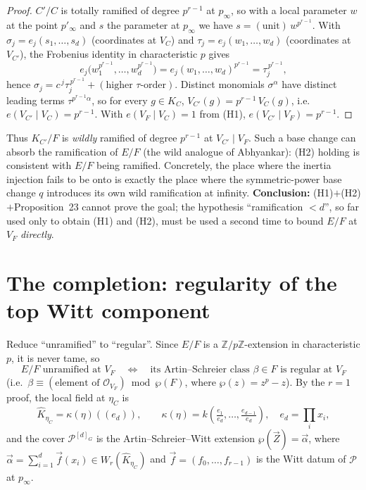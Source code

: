 \documentclass[11pt]{article}
\newcommand{\cP}{\mathcal{P}}
\newcommand{\Z}{\mathbb{Z}}
\newcommand{\Oo}{\mathcal{O}}
\newcommand{\AS}{\wp}
\theoremstyle{plain}
\theoremstyle{definition}
\providecommand{\AS}{\ensuremath{\wp}}
\begin{document}
\begin{proof}
$C'/C$ is totally ramified of degree $p^{r-1}$ at $p_\infty$, so with a local parameter
$w$ at the point $p'_\infty$ and $s$ the parameter at $p_\infty$ we have
$s=(\text{unit})\,w^{p^{r-1}}$. With $\sigma_j=e_j(s_1,\dots,s_d)$ (coordinates at $V_C$) and
$\tau_j=e_j(w_1,\dots,w_d)$ (coordinates at $V_{C'}$), the Frobenius identity in
characteristic $p$ gives
\[
e_j\big(w_1^{p^{r-1}},\dots,w_d^{p^{r-1}}\big)=e_j(w_1,\dots,w_d)^{p^{r-1}}=\tau_j^{\,p^{r-1}},
\]
hence $\sigma_j=c^{\,j}\tau_j^{\,p^{r-1}}+(\text{higher }\tau\text{-order})$. Distinct
monomials $\sigma^\alpha$ have distinct leading terms $\tau^{p^{r-1}\alpha}$, so for every
$g\in K_C$, $V_{C'}(g)=p^{r-1}\,V_C(g)$, i.e.\ $e(V_{C'}\mid V_C)=p^{r-1}$. With
$e(V_F\mid V_C)=1$ from (H1), $e(V_{C'}\mid V_F)=p^{r-1}$.
\end{proof}

Thus $K_{C'}/F$ is \emph{wildly} ramified of degree $p^{r-1}$ at $V_{C'}\mid V_F$. Such a base
change can absorb the ramification of $E/F$ (the wild analogue of Abhyankar): (H2) holding is
consistent with $E/F$ being ramified. Concretely, the place where the inertia injection fails
to be onto is exactly the place where the symmetric-power base change $q$ introduces its own
wild ramification at infinity. \textbf{Conclusion:} (H1)$+$(H2)$+$Proposition~23 cannot prove
the goal; the hypothesis ``ramification $<d$'', so far used only to obtain (H1) and (H2), must
be used a second time to bound $E/F$ at $V_F$ \emph{directly}.

\section{The completion: regularity of the top Witt component}

Reduce ``unramified'' to ``regular''. Since $E/F$ is a $\Z/p\Z$-extension in characteristic
$p$, it is never tame, so
\[
E/F \text{ unramified at } V_F
\quad\Longleftrightarrow\quad
\text{its Artin--Schreier class } \beta\in F \text{ is regular at } V_F
\]
(i.e.\ $\beta\equiv(\text{element of }\Oo_{V_F})\bmod \AS(F)$, where $\AS(z)=z^p-z$). By the
$r=1$ proof, the local field at $\eta_C$ is
\[
\widehat K_{\eta_C}=\kappa(\eta)((e_d)),\qquad
\kappa(\eta)=k\!\left(\tfrac{e_1}{e_d},\dots,\tfrac{e_{d-1}}{e_d}\right),\quad e_d=\textstyle\prod_i x_i,
\]
and the cover $\cP^{[d]_G}$ is the Artin--Schreier--Witt extension
$\AS(\vec Z)=\vec\alpha$, where $\vec\alpha=\sum_{i=1}^d\vec f(x_i)\in W_r(\widehat K_{\eta_C})$
and $\vec f=(f_0,\dots,f_{r-1})$ is the Witt datum of $\cP$ at $p_\infty$.
\end{document}
